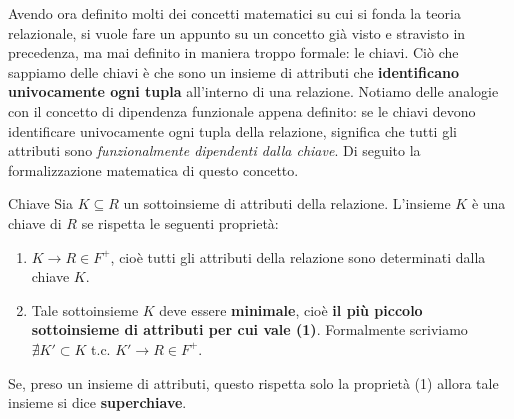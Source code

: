 \documentclass[12pt]{report}
\newcommand{\ra}{
	\rightarrow
}
\begin{document}
	Avendo ora definito molti dei concetti matematici su cui si fonda la teoria relazionale, si vuole fare un appunto su un concetto già visto e stravisto in precedenza, ma mai definito in maniera troppo formale: le chiavi. Ciò che sappiamo delle chiavi è che sono un insieme di attributi che \textbf{identificano univocamente ogni tupla} all'interno di una relazione. Notiamo delle analogie con il concetto di dipendenza funzionale appena definito: se le chiavi devono identificare univocamente ogni tupla della relazione, significa che tutti gli attributi sono \textit{funzionalmente dipendenti dalla chiave}. Di seguito la formalizzazione matematica di questo concetto. 
	\begin{definizione}{Chiave}{}
		\label{def:chiave}
		Sia $K \subseteq R$ un sottoinsieme di attributi della relazione. L'insieme $K$ è una chiave di $R$ se rispetta le seguenti proprietà:
		\begin{enumerate}
			\item $K \ra R \in F^+$, cioè tutti gli attributi della relazione sono determinati dalla chiave $K$.
			
			\item Tale sottoinsieme $K$ deve essere \textbf{minimale}, cioè \textbf{il più piccolo sottoinsieme di attributi per cui vale (1)}. Formalmente scriviamo $\nexists K' \subset K$ t.c. $K' \ra R \in F^+$.
		\end{enumerate}
		Se, preso un insieme di attributi, questo rispetta solo la proprietà (1) allora tale insieme si dice \textbf{superchiave}.
	\end{definizione}
	
\end{document}
